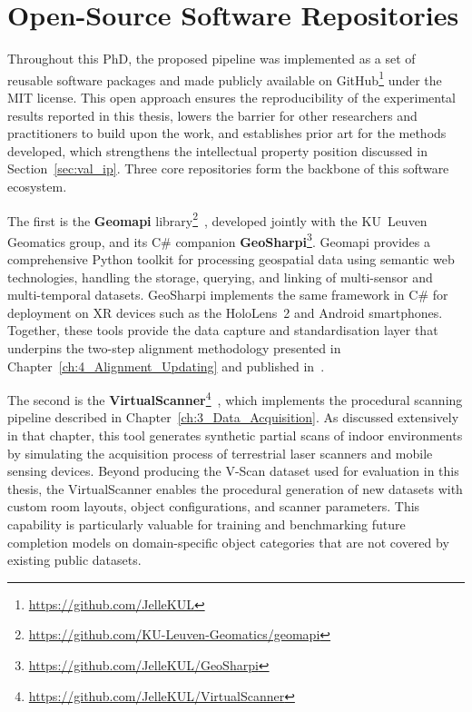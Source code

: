 \section{Open-Source Software Repositories}
\label{sec:val_repos}

Throughout this PhD, the proposed pipeline was implemented as a set of reusable software packages and made publicly available on GitHub\footnote{\url{https://github.com/JelleKUL}} under the MIT license. This open approach ensures the reproducibility of the experimental results reported in this thesis, lowers the barrier for other researchers and practitioners to build upon the work, and establishes prior art for the methods developed, which strengthens the intellectual property position discussed in Section~\ref{sec:val_ip}. Three core repositories form the backbone of this software ecosystem.

The first is the \textbf{Geomapi} library\footnote{\url{https://github.com/KU-Leuven-Geomatics/geomapi}}~\cite{bassier_geomapi_2024}, developed jointly with the KU~Leuven Geomatics group, and its C\# companion \textbf{GeoSharpi}\footnote{\url{https://github.com/JelleKUL/GeoSharpi}}. Geomapi provides a comprehensive Python toolkit for processing geospatial data using semantic web technologies, handling the storage, querying, and linking of multi-sensor and multi-temporal datasets. GeoSharpi implements the same framework in C\# for deployment on XR devices such as the HoloLens~2 and Android smartphones. Together, these tools provide the data capture and standardisation layer that underpins the two-step alignment methodology presented in Chapter~\ref{ch:4_Alignment_Updating} and published in~\cite{vermandere_two-step_2022}.

The second is the \textbf{VirtualScanner}\footnote{\url{https://github.com/JelleKUL/VirtualScanner}}~\cite{vermandere_synthetic_2026}, which implements the procedural scanning pipeline described in Chapter~\ref{ch:3_Data_Acquisition}. As discussed extensively in that chapter, this tool generates synthetic partial scans of indoor environments by simulating the acquisition process of terrestrial laser scanners and mobile sensing devices. Beyond producing the V-Scan dataset used for evaluation in this thesis, the VirtualScanner enables the procedural generation of new datasets with custom room layouts, object configurations, and scanner parameters. This capability is particularly valuable for training and benchmarking future completion models on domain-specific object categories that are not covered by existing public datasets.

